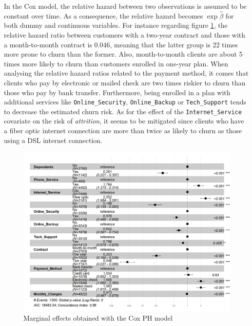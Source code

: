 \documentclass[
]{book}
\begin{document}
In the Cox model, the relative hazard between two observations is assumed to be constant over time. As a consequence, the relative hazard becomes \(\exp \hat{\beta}\) for both dummy and continuous variables. For instance regarding figure \ref{fig:coxmarginaleffects}, the relative hazard ratio between customers with a two-year contract and those with a month-to-month contract is 0.046, meaning that the latter group is 22 times more prone to churn than the former. Also, month-to-month clients are about 5 times more likely to churn than customers enrolled in one-year plan. When analysing the relative hazard ratios related to the payment method, it comes that clients who pay by electronic or mailed check are two times riskier to churn than those who pay by bank transfer. Furthermore, being enrolled in a plan with additional services like \texttt{Online\_Security}, \texttt{Online\_Backup} or \texttt{Tech\_Support} tends to decrease the estimated churn risk. As for the effect of the \texttt{Internet\_Service} covariate on the risk of \emph{attrition}, it seems to be mitigated since clients who have a fiber optic internet connection are more than twice as likely to churn as those using a DSL internet connection.

\begin{figure}

{\centering \includegraphics[width=18.06in]{./imgs/cox_ggforest} 

}

\caption{Marginal effects obtained with the Cox PH model}\label{fig:coxmarginaleffects}
\end{figure}
\end{document}
